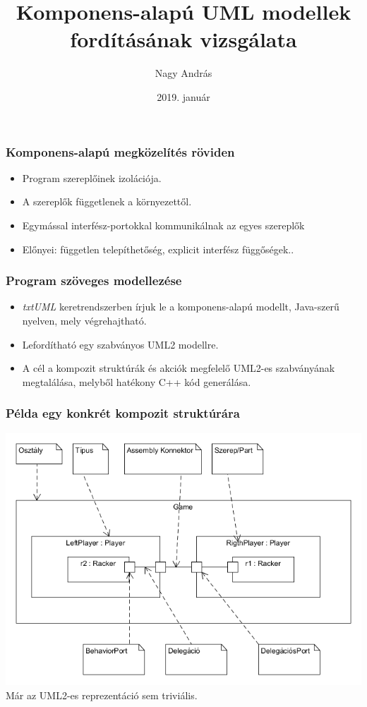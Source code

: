 \documentclass[11pt]{beamer}
\author{Nagy András}
\title{Komponens-alapú UML modellek fordításának vizsgálata}
\date{2019. január}
\begin{document}
\begin{frame}
\titlepage
\end{frame}

\begin{frame}
	\frametitle{Komponens-alapú megközelítés röviden}
	
	\begin{itemize}
		\item Program szereplőinek izolációja.
		\item A szereplők függetlenek a környezettől.
		\item Egymással interfész-portokkal kommunikálnak az egyes szereplők
		\item Előnyei: független telepíthetőség, explicit interfész függőségek..
	\end{itemize}
\end{frame}

\begin{frame}[fragile]
	\frametitle{Program szöveges modellezése}
	
	\begin{itemize}
		\item \textit{txtUML} keretrendszerben írjuk le a komponens-alapú modellt, Java-szerű nyelven, mely végrehajtható.
		\item Lefordítható egy szabványos UML2 modellre.
		\item A cél a kompozit struktúrák és akciók megfelelő UML2-es szabványának megtalálása, melyből hatékony C++ kód generálása.
	\end{itemize}
	
\end{frame}


\begin{frame}[fragile]
	\frametitle{Példa egy konkrét kompozit struktúrára}	
	\includegraphics[scale=0.4]{vedes_demo.png}	
	Már az UML2-es reprezentáció sem triviális.

	
\end{frame}
\end{document}
